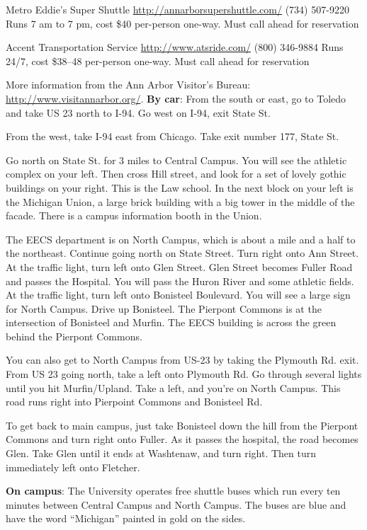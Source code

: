 \documentclass[11pt]{article}
\begin{document}
Metro Eddie’s Super Shuttle
\href{http://annarborsupershuttle.com/}{http://annarborsupershuttle.com/}
(734) 507-9220
Runs 7 am to 7 pm, cost \$40 per-person one-way.
Must call ahead for reservation


Accent Transportation Service
\href{http://www.atsride.com/}{http://www.atsride.com/}
(800) 346-9884
Runs 24/7, cost \$38–48 per-person one-way.
Must call ahead for reservation

More information from the Ann Arbor Visitor’s Bureau:  \href{http://www.visitannarbor.org/}{http://www.visitannarbor.org/}.
\textbf{By car}:
From the south or east, go to Toledo and take US 23 north to I-94.  Go
west on I-94, exit State St.

From the west, take I-94 east from Chicago.  Take exit number 177,
State St.

Go north on State St. for 3 miles to Central Campus.  You will see the
athletic complex on your left.  Then cross Hill street, and look for a
set of lovely gothic buildings on your right.  This is the Law school.
In the next block on your left is the Michigan Union, a large brick
building with a big tower in the middle of the facade.  There is a
campus information booth in the Union.

The EECS department is on North Campus, which is about a mile and a
half to the northeast.  Continue going north on State Street.  Turn
right onto Ann Street.  At the traffic light, turn left onto Glen
Street.  Glen Street becomes Fuller Road and passes the Hospital.  You
will pass the Huron River and some athletic fields.  At the traffic
light, turn left onto Bonisteel Boulevard.  You will see a large sign
for North Campus.  Drive up Bonisteel. The Pierpont Commons is at the
intersection of Bonisteel and Murfin.  The EECS building is across the
green behind the Pierpont Commons.

You can also get to North Campus from US-23 by taking the Plymouth
Rd. exit.  From US 23 going north, take a left onto Plymouth Rd.  Go
through several lights until you hit Murfin/Upland.  Take a left, and
you’re on North Campus.  This road runs right into Pierpoint Commons
and Bonisteel Rd.

To get back to main campus, just take Bonisteel down the hill from the
Pierpont Commons and turn right onto Fuller.  As it passes the
hospital, the road becomes Glen.  Take Glen until it ends at
Washtenaw, and turn right.  Then turn immediately left onto Fletcher.

\textbf{On campus}:
The University operates free shuttle buses which run every ten minutes
between Central Campus and North Campus.  The buses are blue and have
the word “Michigan” painted in gold on the sides.
\end{document}
